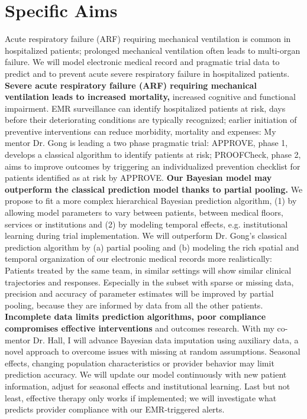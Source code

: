 \documentclass[11pt,notitlepage]{article}
\begin{document}
\part*{Specific Aims}
Acute respiratory failure (ARF) requiring mechanical ventilation is common in hospitalized patients; prolonged mechanical ventilation often leads to multi-organ failure. We will model electronic medical record and pragmatic trial data to predict and to prevent acute severe respiratory failure in hospitalized patients.\newline
\textbf{Severe acute respiratory failure (ARF) requiring mechanical ventilation leads to increased mortality,} increased cognitive and functional impairment. EMR surveillance can identify hospitalized patients at risk, days before their deteriorating conditions are typically recognized; earlier initiation of preventive interventions can reduce morbidity, mortality and expenses: My mentor Dr. Gong is leading a two phase pragmatic trial: APPROVE, phase 1, develops a classical algorithm to identify patients at risk; PROOFCheck, phase 2, aims to improve outcomes by triggering an individualized prevention checklist for patients identified as at risk by APPROVE. \newline
\textbf{Our Bayesian model may outperform the classical prediction model thanks to partial pooling.} 
We propose to fit a more complex hierarchical Bayesian prediction algorithm, (1) by allowing model parameters to vary between patients, between medical floors, services or institutions and (2) by modeling temporal effects, e.g. institutional learning during trial implementation. We will outperform Dr. Gong's classical prediction algorithm by (a) partial pooling and (b) modeling the rich spatial and temporal organization of our electronic medical records more realistically: Patients treated by the same team, in similar settings will show similar clinical trajectories and responses. Especially in the subset with sparse or missing data, precision and accuracy of parameter estimates will be improved by partial pooling, because they are informed by data from all the other patients. 
\newline \textbf{Incomplete data limits prediction algorithms, poor compliance compromises effective interventions} and outcomes research. With my co-mentor Dr. Hall, I will advance Bayesian data imputation using auxiliary data, a novel approach to overcome issues with missing at random assumptions. Seasonal effects, changing population characteristics or provider behavior may limit prediction accuracy. We will update our model continuously with new patient information, adjust for seasonal effects and institutional learning. Last but not least, effective therapy only works if implemented; we will investigate what predicts provider compliance with our EMR-triggered alerts. 
\end{document}
